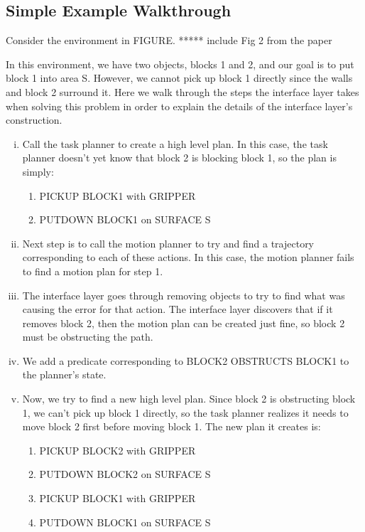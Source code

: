 \documentclass[12pt]{article}
\begin{document}
\subsection{Simple Example Walkthrough}

Consider the environment in FIGURE.  ***** include Fig 2 from the paper

In this environment, we have two objects, blocks 1 and 2, and our goal is to put block 1 into area S.  
However, we cannot pick up block 1 directly since the walls and block 2 surround it.  
Here we walk through the steps the interface layer takes when solving this problem in order to explain the details of the interface layer's construction.

\begin{enumerate}[i.]

\item Call the task planner to create a high level plan.  
In this case, the task planner doesn't yet know that block 2 is blocking block 1, so the plan is simply:

\begin{enumerate}[1.]
\item PICKUP BLOCK1 with GRIPPER

\item PUTDOWN BLOCK1 on SURFACE S
\end{enumerate}

\item Next step is to call the motion planner to try and find a trajectory corresponding to each of these actions.  
In this case, the motion planner fails to find a motion plan for step 1.  

\item The interface layer goes through removing objects to try to find what was causing the error for that action.  
The interface layer discovers that if it removes block 2, then the motion plan can be created just fine, so block 2 must be obstructing the path.

\item We add a predicate corresponding to BLOCK2 OBSTRUCTS BLOCK1 to the planner's state.

\item Now, we try to find a new high level plan.  
Since block 2 is obstructing block 1, we can't pick up block 1 directly, so the task planner realizes it needs to move block 2 first before moving block 1. 
The new plan it creates is:

\begin{enumerate}[1.]
\item PICKUP BLOCK2 	with GRIPPER
\item PUTDOWN BLOCK2 on SURFACE S
\item PICKUP BLOCK1 with GRIPPER
\item PUTDOWN BLOCK1 on SURFACE S
\end{enumerate}


\end{enumerate}
\end{document}
